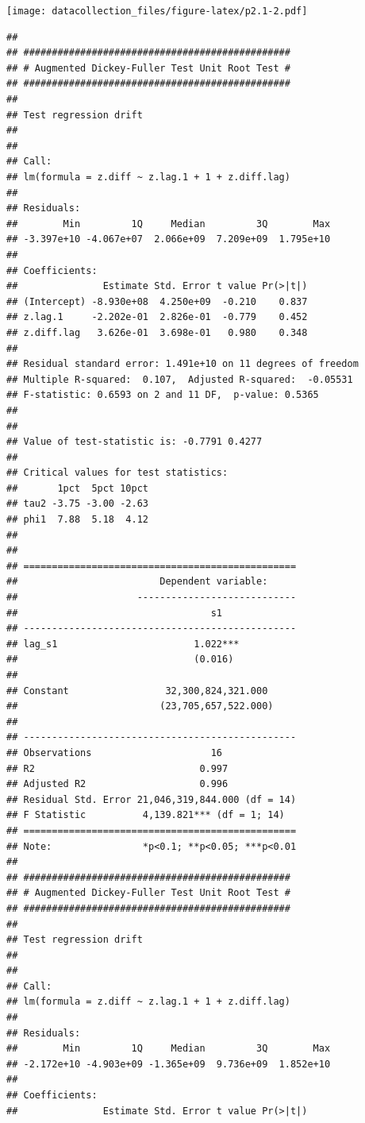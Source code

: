 \documentclass[
]{article}
\begin{document}
\texttt{[image: datacollection\_files/figure-latex/p2.1-2.pdf]}

\begin{verbatim}
## 
## ############################################### 
## # Augmented Dickey-Fuller Test Unit Root Test # 
## ############################################### 
## 
## Test regression drift 
## 
## 
## Call:
## lm(formula = z.diff ~ z.lag.1 + 1 + z.diff.lag)
## 
## Residuals:
##        Min         1Q     Median         3Q        Max 
## -3.397e+10 -4.067e+07  2.066e+09  7.209e+09  1.795e+10 
## 
## Coefficients:
##               Estimate Std. Error t value Pr(>|t|)
## (Intercept) -8.930e+08  4.250e+09  -0.210    0.837
## z.lag.1     -2.202e-01  2.826e-01  -0.779    0.452
## z.diff.lag   3.626e-01  3.698e-01   0.980    0.348
## 
## Residual standard error: 1.491e+10 on 11 degrees of freedom
## Multiple R-squared:  0.107,  Adjusted R-squared:  -0.05531 
## F-statistic: 0.6593 on 2 and 11 DF,  p-value: 0.5365
## 
## 
## Value of test-statistic is: -0.7791 0.4277 
## 
## Critical values for test statistics: 
##       1pct  5pct 10pct
## tau2 -3.75 -3.00 -2.63
## phi1  7.88  5.18  4.12
## 
## 
## ================================================
##                         Dependent variable:     
##                     ----------------------------
##                                  s1             
## ------------------------------------------------
## lag_s1                        1.022***          
##                               (0.016)           
##                                                 
## Constant                 32,300,824,321.000     
##                         (23,705,657,522.000)    
##                                                 
## ------------------------------------------------
## Observations                     16             
## R2                             0.997            
## Adjusted R2                    0.996            
## Residual Std. Error 21,046,319,844.000 (df = 14)
## F Statistic          4,139.821*** (df = 1; 14)  
## ================================================
## Note:                *p<0.1; **p<0.05; ***p<0.01
## 
## ############################################### 
## # Augmented Dickey-Fuller Test Unit Root Test # 
## ############################################### 
## 
## Test regression drift 
## 
## 
## Call:
## lm(formula = z.diff ~ z.lag.1 + 1 + z.diff.lag)
## 
## Residuals:
##        Min         1Q     Median         3Q        Max 
## -2.172e+10 -4.903e+09 -1.365e+09  9.736e+09  1.852e+10 
## 
## Coefficients:
##               Estimate Std. Error t value Pr(>|t|)

\end{verbatim}
\end{document}
